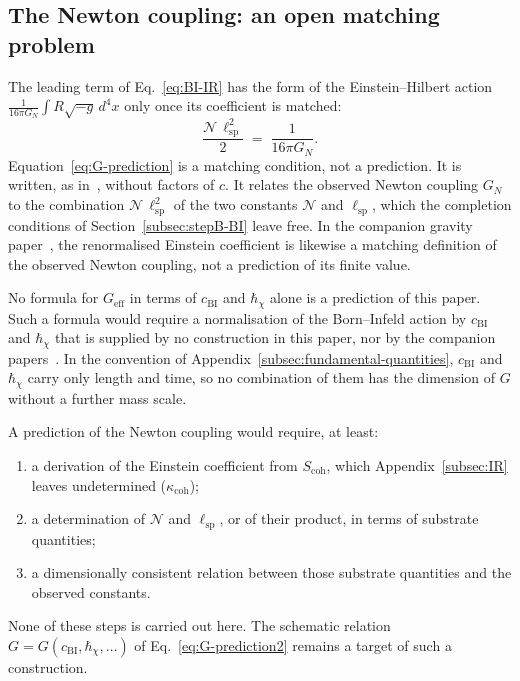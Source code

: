 \subsection{The Newton coupling: an open matching problem}
\label{subsec:stepB-G}

The leading term of Eq.~\eqref{eq:BI-IR} has the form of the Einstein--Hilbert action
$\frac{1}{16\pi G_N}\int R\sqrt{-g}\,d^4x$ only once its coefficient is matched:
\begin{equation}
  \frac{\mathcal{N}\,\ell_{\mathrm{sp}}^{2}}{2} \;=\; \frac{1}{16\pi G_N}.
  \label{eq:G-prediction}
\end{equation}
Equation~\eqref{eq:G-prediction} is a matching condition, not a prediction.
It is written, as in~\cite{Beau2026h}, without factors of $c$.
It relates the observed Newton coupling $G_N$ to the combination $\mathcal{N}\,\ell_{\mathrm{sp}}^{2}$ of the two
constants $\mathcal{N}$ and $\ell_{\mathrm{sp}}$, which the completion conditions of Section~\ref{subsec:stepB-BI}
leave free.
In the companion gravity paper~\cite{Beau2026h}, the renormalised Einstein coefficient is likewise a matching
definition of the observed Newton coupling, not a prediction of its finite value.

No formula for $G_{\mathrm{eff}}$ in terms of $c_{\mathrm{BI}}$ and $\hbar_\chi$ alone is a prediction of this paper.
Such a formula would require a normalisation of the Born--Infeld action by $c_{\mathrm{BI}}$ and $\hbar_\chi$ that
is supplied by no construction in this paper, nor by the companion papers~\cite{Beau2026c,Beau2026h}.
In the convention of Appendix~\ref{subsec:fundamental-quantities}, $c_{\mathrm{BI}}$ and $\hbar_\chi$ carry only
length and time, so no combination of them has the dimension of $G$ without a further mass scale.

A prediction of the Newton coupling would require, at least:
\begin{enumerate}[label=(\roman*)]
  \item a derivation of the Einstein coefficient from $S_{\mathrm{coh}}$, which Appendix~\ref{subsec:IR} leaves
  undetermined ($\kappa_{\mathrm{coh}}$);
  \item a determination of $\mathcal{N}$ and $\ell_{\mathrm{sp}}$, or of their product, in terms of substrate
  quantities;
  \item a dimensionally consistent relation between those substrate quantities and the observed constants.
\end{enumerate}
None of these steps is carried out here.
The schematic relation $G = G(c_{\mathrm{BI}}, \hbar_\chi, \ldots)$ of Eq.~\eqref{eq:G-prediction2} remains a
target of such a construction.
